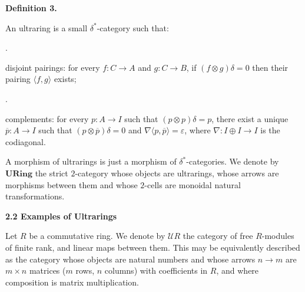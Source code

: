  
 
\par\medskip\noindent\textbf{Definition 3.}\par
 
 
An ultraring is a small $\delta^{\ast}$-category such that:\par
  
\par{}. 
 
disjoint pairings: for every $f:C\to A$ and $g:C\to B$, if $(f\otimes g)\delta=0$ then their pairing $\langle f,g\rangle$ exists;\par
 
 
 
\par{}. 
 
complements: for every $p:A\to I$ such that $(p\otimes p)\delta=p$, there exist a unique $\overline{p}:A\to I$ such that $(p\otimes\overline{p})\delta=0$ and $\nabla\langle p,\overline{p}\rangle=\varepsilon$, where $\nabla:I\oplus I\to I$ is the codiagonal.\par
 
 
  
 
 
A morphism of ultrarings is just a morphism of $\delta^{\ast}$-categories. We denote by $\mathbf{URing}$ the strict $2$-category whose objects are ultrarings, whose arrows are morphisms between them and whose $2$-cells are monoidal natural transformations.\par
 
 
 
 
 
 
\par\medskip\noindent\textbf{2.2 Examples of Ultrarings}\par
 
 
Let $R$ be a commutative ring. We denote by $\mathcal{U}R$ the category of free $R$-modules of finite rank, and linear maps between them. This may be equivalently described as the category whose objects are natural numbers and whose arrows $n\to m$ are $m\times n$ matrices ($m$ rows, $n$ columns) with coefficients in $R$, and where composition is matrix multiplication.\par
 
